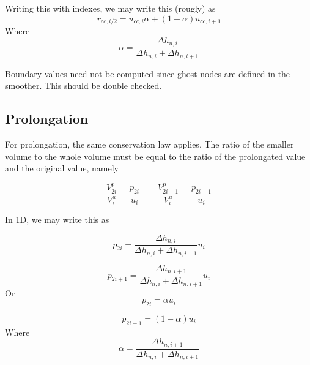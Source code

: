 \documentclass[11pt]{article}
\begin{document}
Writing this with indexes, we may write this (rougly) as
\begin{equation}
	r_{cc,i/2} = u_{cc,i} \alpha + (1-\alpha)u_{cc,i+1}
\end{equation}
Where
\begin{equation}
	\alpha = \frac{\Delta h_{n,i}}{\Delta h_{n,i}+\Delta h_{n,i+1}}
\end{equation}

Boundary values need not be computed since ghost nodes are defined in the smoother. This should be double checked.

\subsection{Prolongation}

For prolongation, the same conservation law applies. The ratio of the smaller volume to the whole volume must be equal to the ratio of the prolongated value and the original value, namely

\begin{equation}
	\frac{V_{2i}^{p}}{V_{i}^{u}} = \frac{p_{2i}}{u_{i}} \qquad 
	\frac{V_{2i-1}^{p}}{V_{i}^{u}} = \frac{p_{2i-1}}{u_{i}}
\end{equation}

In 1D, we may write this as

\begin{equation}
	p_{2i} = \frac{\Delta h_{n,i}}{\Delta h_{n,i} + \Delta h_{n,i+1}} u_i
\end{equation}

\begin{equation}
	p_{2i+1} = \frac{\Delta h_{n,i+1}}{\Delta h_{n,i} + \Delta h_{n,i+1}} u_i
\end{equation}
Or
\begin{equation}
	p_{2i} = \alpha u_i
\end{equation}

\begin{equation}
	p_{2i+1} = (1-\alpha) u_i
\end{equation}
Where
\begin{equation}
	\alpha = \frac{\Delta h_{n,i+1}}{\Delta h_{n,i} + \Delta h_{n,i+1}}
\end{equation}
\end{document}
